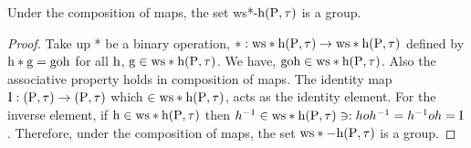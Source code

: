 \begin{thm}\label{thm5.2.24}
Under the composition of maps, the set ws*-$\mathrm{h}(\mathrm{P}, \tau)$ is a group.
\end{thm}

\begin{proof}
Take up * be a binary operation, $*: \mathrm{ws} * \mathrm{h}(\mathrm{P}, \tau) \to  \mathrm{ws} * \mathrm{h}(\mathrm{P}, \tau)$ defined by $\mathrm{h} * \mathrm{g} = \text{goh}$ for all $\mathrm{h}$, $\mathrm{g} \in \mathrm{ws} * \mathrm{h}(\mathrm{P}, \tau)$. We have, $\text{goh} \in \mathrm{ws} * \mathrm{h}(\mathrm{P},\tau)$. Also the associative property holds in composition of maps. The identity map $\mathrm{I} : (\mathrm{P}, \tau) \to  (\mathrm{P}, \tau)$ which $\in \mathrm{ws} *\mathrm{h}(\mathrm{P}, \tau)$, acts as the identity element. For the inverse element, if $\mathrm{h} \in \mathrm{ws} * \mathrm{h}(\mathrm{P},\tau)$ then $h^{-1} \in \mathrm{ws} * \mathrm{h}(\mathrm{P},\tau) \ni: hoh^{-1}=h^{-1}oh=\mathrm{I}$. Therefore, under the composition of maps, the set $\mathrm{ws} *-\mathrm{h}(\mathrm{P},\tau)$ is a group.
\end{proof}

